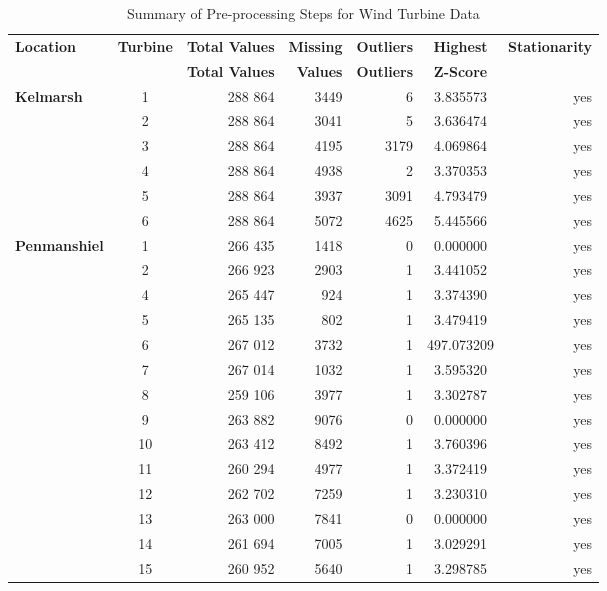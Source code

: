 \documentclass{article}
\begin{document}
\begin{table}
\footnotesize
\centering
\caption{Summary of Pre-processing Steps for Wind Turbine Data}
    \begin{tabular}{l|c|r|r|r|S|r}
    \toprule
    \textbf{Location} & \textbf{Turbine} & \textbf{Total Values} & \textbf{Missing} & \textbf{Outliers} & \textbf{Highest} & \textbf{Stationarity} \\
     & & \textbf{Total Values} & \textbf{Values} & \textbf{Outliers} & \textbf{Z-Score} & \\
    \midrule
\textbf{Kelmarsh} & 1 & 288 864 & 3449 & 6 & 3.835573 & yes \\
         & 2 & 288 864 & 3041 & 5 & 3.636474 & yes \\
         & 3 & 288 864 & 4195 & 3179 & 4.069864 & yes \\
         & 4 & 288 864 & 4938 & 2 & 3.370353 & yes \\
         & 5 & 288 864 & 3937 & 3091 & 4.793479 & yes \\
         & 6 & 288 864 & 5072 & 4625 & 5.445566 & yes \\
    \midrule
\textbf{Penmanshiel} & 1 & 266 435 & 1418 & 0 & 0.000000 & yes \\
            & 2 & 266 923 & 2903 & 1 & 3.441052 & yes \\
            & 4 & 265 447 & 924 & 1 & 3.374390 & yes \\
            & 5 & 265 135 & 802 & 1 & 3.479419 & yes \\
            & 6 & 267 012 & 3732 & 1 & 497.073209 & yes \\
            & 7 & 267 014 & 1032 & 1 & 3.595320 & yes \\
            & 8 & 259 106 & 3977 & 1 & 3.302787 & yes \\
            & 9 & 263 882 & 9076 & 0 & 0.000000 & yes \\
            & 10 & 263 412 & 8492 & 1 & 3.760396 & yes \\
            & 11 & 260 294 & 4977 & 1 & 3.372419 & yes \\
            & 12 & 262 702 & 7259 & 1 & 3.230310 & yes \\
            & 13 & 263 000 & 7841 & 0 & 0.000000 & yes \\
            & 14 & 261 694 & 7005 & 1 & 3.029291 & yes \\
            & 15 & 260 952 & 5640 & 1 & 3.298785 & yes \\
    \bottomrule
    \end{tabular}
\label{tab:preprocessing_windturbines}
\end{table}
\end{document}
